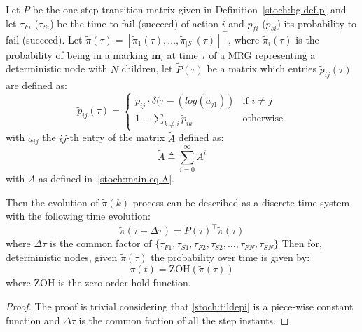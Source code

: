 \begin{proposition}
\label{stoch:ps.prop.det}
Let $P$ be the one-step transition matrix given in Definition~\ref{stoch:bg.def.p} and let $\tau_{Fi}$ ($\tau_{Si}$) be the time to fail (succeed) of action $i$ and $ p_{fi}$ ($  p_{si}$) its probability to fail (succeed). Let $\tilde \pi(\tau)=[\tilde \pi_1(\tau),\ldots, \tilde \pi_{\left\vert{\mathcal{S}}\right\vert}(\tau)]^\top$, where $ \tilde \pi_i(\tau)$ is the probability of being in a marking $\mathbf{m}_i$ at time $\tau$ of a MRG representing a deterministic node with $N$ children, let $\tilde P(\tau)$ be a matrix which entries $\tilde p_{ij}(\tau)$ are defined as:
\begin{equation}
\tilde p_{ij}(\tau) = \begin{cases} p_{ij} \cdot \delta(\tau-(log (\tilde a_{j1})) &\mbox{if } i\neq j \\ 
1- \displaystyle\sum_{k \neq i} \tilde p_{ik} & \text{otherwise}  \end{cases} 
\label{stoch:ps.eq.ptilde}
\end{equation}
with $\tilde a_{ij}$ the $ij$-th entry of the matrix $\tilde A$ defined as:
\begin{equation}
\tilde A \triangleq \sum_{i=0}^{\infty} A^i
\label{stoch:ps.eq.atilde}
\end{equation}
with $A$ as defined in~\eqref{stoch:main.eq.A}.

Then the evolution of $ \tilde \pi(k)$ process can be described as a discrete time system with the following time evolution:
\begin{equation}
\label{stoch:tildepi}
\tilde \pi(\tau +{\Delta \tau}) = \tilde P(\tau)^\top\tilde \pi(\tau) 
\end{equation}
where $\Delta \tau$ is the common factor of $\{\tau_{F1},\tau_{S1},\tau_{F2},\tau_{S2},\ldots,\tau_{FN},\tau_{SN}\}$
Then for, deterministic nodes, given $\tilde \pi(\tau)$ the probability over time is given by:
\begin{equation}
\label{stoch:ps.eq.pdet}
\pi(t) = \mbox{ZOH}(\tilde \pi(\tau))
\end{equation}
where ZOH is the zero order hold function.
\end{proposition}
\begin{proof}
The proof is trivial considering that \eqref{stoch:tildepi} is a piece-wise constant function and $\Delta \tau$ is the common faction of all the step instants.
\end{proof}


